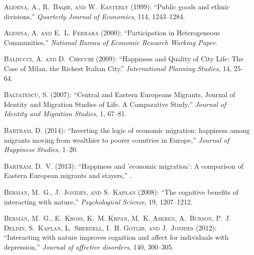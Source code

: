 \documentclass[10pt, letterpaper]{article}
\begin{document}
\begin{spacing}{2.0}
\begin{thebibliography}{115}
\textsc{Alesina, A., R.~Baqir, and W.~Easterly} (1999): \enquote{Public goods
  and ethnic divisions,} \emph{Quarterly Journal of Economics}, 114,
  1243--1284.

\textsc{Alesina, A. and E.~L. Ferrara} (2000): \enquote{Participation in
  Heterogeneous Communities,} \emph{National Bureau of Economic Research
  Working Paper}.

\textsc{Balducci, A. and D.~Checchi} (2009): \enquote{Happiness and Quality of
  City Life: The Case of Milan, the Richest Italian City.} \emph{International
  Planning Studies}, 14, 25--64.

\textsc{Baltatescu, S.} (2007): \enquote{Central and Eastern Europeans
  Migrants, Journal of Identity and Migration Studies of Life. A Comparative
  Study,} \emph{Journal of Identity and Migration Studies}, 1, 67--81.

\textsc{Bartram, D.} (2014): \enquote{Inverting the logic of economic
  migration: happiness among migrants moving from wealthier to poorer countries
  in Europe,} \emph{Journal of Happiness Studies}, 1--20.

\textsc{Bartram, D.~V.} (2013): \enquote{Happiness and 'economic migration': A
  comparison of Eastern European migrants and stayers,} .

\textsc{Berman, M.~G., J.~Jonides, and S.~Kaplan} (2008): \enquote{The
  cognitive benefits of interacting with nature,} \emph{Psychological Science},
  19, 1207--1212.

\textsc{Berman, M.~G., E.~Kross, K.~M. Krpan, M.~K. Askren, A.~Burson, P.~J.
  Deldin, S.~Kaplan, L.~Sherdell, I.~H. Gotlib, and J.~Jonides} (2012):
  \enquote{Interacting with nature improves cognition and affect for
  individuals with depression,} \emph{Journal of affective disorders}, 140,
  300--305.


\end{thebibliography}
\end{spacing}
\end{document}
